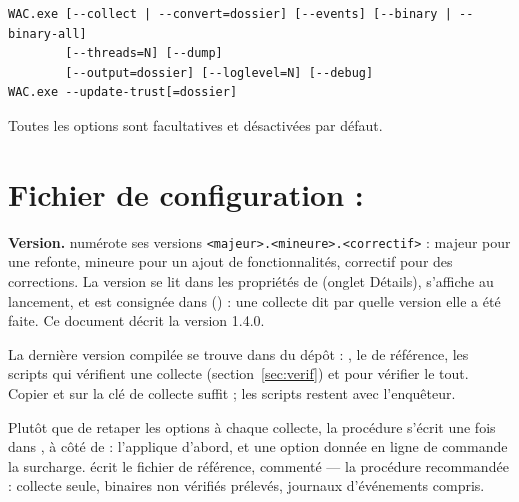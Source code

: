 \documentclass[11pt,a4paper,oneside]{report}
\begin{document}
\begin{lstlisting}
WAC.exe [--collect | --convert=dossier] [--events] [--binary | --binary-all]
        [--threads=N] [--dump]
        [--output=dossier] [--loglevel=N] [--debug]
WAC.exe --update-trust[=dossier]
\end{lstlisting}

Toutes les options sont facultatives et désactivées par défaut.

\section{Fichier de configuration : }

\textbf{Version.} \wac{} numérote ses versions \texttt{<majeur>.<mineure>.<correctif>} :
majeur pour une refonte, mineure pour un ajout de fonctionnalités, correctif
pour des corrections. La version se lit dans les propriétés de
 (onglet Détails), s'affiche au lancement, et est consignée
dans  () : une collecte dit par
quelle version elle a été faite. Ce document décrit la version 1.4.0.

La dernière version compilée se trouve dans  du dépôt :
, le  de référence, les scripts qui
vérifient une collecte (section~\ref{sec:verif}) et 
pour vérifier le tout. Copier  et  sur la
clé de collecte suffit ; les scripts restent avec l'enquêteur.

Plutôt que de retaper les options à chaque collecte, la procédure s'écrit une
fois dans , à côté de  : \wac{} l'applique
d'abord, et une option donnée en ligne de commande la surcharge.
 écrit le fichier de référence, commenté — la procédure
recommandée : collecte seule, binaires non vérifiés prélevés, journaux
d'événements compris.
\end{document}
